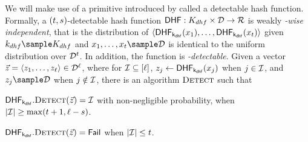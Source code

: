 %
We will make use of a primitive introduced by \citet{bhowmick2021apple} called a detectable hash 
function. Formally, a $(t, s)$-detectable 
hash function $\dhf: \dhfKeySpace \times \dhfDomain \rightarrow \dhfRange$ is weakly \textit{\dhfParamMatchThreshold-wise
  independent}, that is the distribution of
  $\langle\dhf[\dhfKey](\genericFnInput[1]), \dots,
  \dhf[\dhfKey](\genericFnInput[\dhfParamMatchThreshold])\rangle$
  given $\dhfKey \getsr \dhfKeySpace$ and $\genericFnInput[1], \dots,
  \genericFnInput[\dhfParamMatchThreshold] \getsr \dhfDomain$ is
  identical to the uniform distribution over
  $\mathcal{D}^{t}$. In addition, the function is \textit{\dhfParamRandThreshold-detectable}. 
  Given a vector $\genericVec = \tupleDefn{\genericVec[1], \dots, 
    \genericVec[\genericVecLen]} \in \dhfDomain^{\genericVecLen}$, where for $\matchedIndexSet 
  \subseteq \nats[\genericVecLen]$, $\genericVec[\projIdx] \gets 
  \dhf[\dhfKey](\genericFnInput[\projIdx])$ when $\projIdx \in \matchedIndexSet$, 
  and $\genericVec[\projIdx] \getsr \dhfDomain$ when $\projIdx \notin \matchedIndexSet$, 
  there is an algorithm $\textsc{Detect}$ such that 

	\itemListStart
  \item $\dhf[\dhfKey].\dhfDetect(\genericVec) =
    \matchedIndexSet$ with non-negligible probability,
    when $\setSize{\matchedIndexSet} \ge
    \max(\dhfParamMatchThreshold+1, \genericVecLen -
    \dhfParamRandThreshold)$.
  \item $\dhf[\dhfKey].\dhfDetect(\genericVec) =
    \dhfFail$ when $\setSize{\matchedIndexSet} \le
    \dhfParamMatchThreshold$.
\itemListEnd
\fi 

